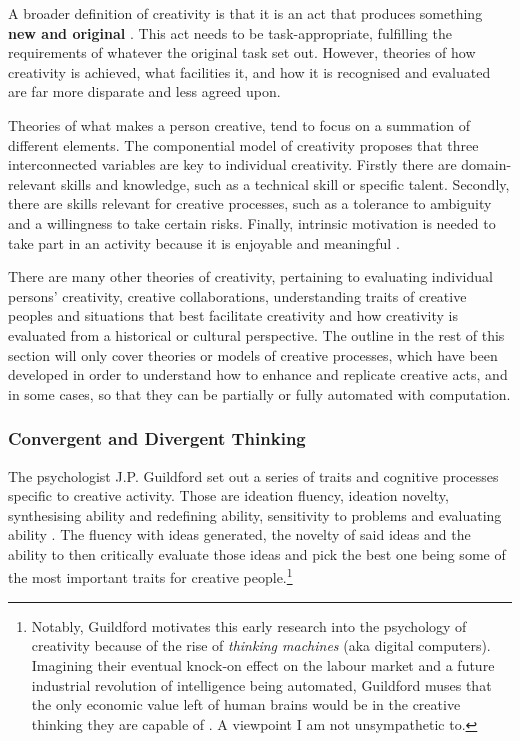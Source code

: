 A broader definition of creativity is that it is an act that produces something \textbf{new and original} \citep{kaufman2021overview}. This act needs to be task-appropriate, fulfilling the requirements of whatever the original task set out. 
However, theories of how creativity is achieved, what facilities it, and how it is recognised and evaluated are far more disparate and less agreed upon. 

Theories of what makes a person creative, tend to focus on a summation of different elements. 
The componential model of creativity proposes that three interconnected variables are key to individual creativity.
Firstly there are domain-relevant skills and knowledge, such as a technical skill or specific talent.
Secondly, there are skills relevant for creative processes, such as a tolerance to ambiguity and a willingness to take certain risks.
Finally, intrinsic motivation is needed to take part in an activity because it is enjoyable and meaningful \citep{amabile1983social}.

There are many other theories of creativity, pertaining to evaluating individual persons' creativity, creative collaborations, understanding traits of creative peoples and situations that best facilitate creativity and how creativity is evaluated from a historical or cultural perspective. 
The outline in the rest of this section will only cover theories or models of creative processes, which have been developed in order to understand how to enhance and replicate creative acts, and in some cases, so that they can be partially or fully automated with computation.

\subsubsection{Convergent and Divergent Thinking}

The psychologist J.P. Guildford set out a series of traits and cognitive processes specific to creative activity. Those are ideation fluency, ideation novelty, synthesising ability and redefining ability, sensitivity to problems and evaluating ability \citep{guilford1950creativity}. The fluency with ideas generated, the novelty of said ideas and the ability to then critically evaluate those ideas and pick the best one being some of the most important traits for creative people.\footnote{Notably, Guildford motivates this early research into the psychology of creativity because of the rise of \textit{thinking machines} (aka digital computers).
Imagining their eventual knock-on effect on the labour market and a future industrial revolution of intelligence being automated, Guildford muses that the only economic value left of human brains would be in the creative thinking they are capable of \citep{guilford1950creativity}. 
A viewpoint I am not unsympathetic to.}


